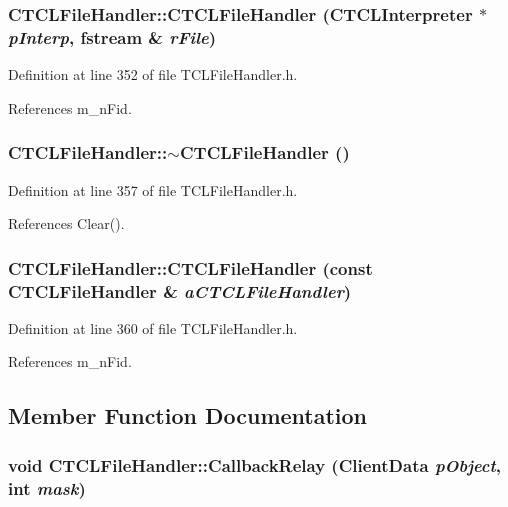 \subsubsection{\setlength{\rightskip}{0pt plus 5cm}CTCLFile\-Handler::CTCLFile\-Handler ({\bf CTCLInterpreter} $\ast$ {\em p\-Interp}, fstream \& {\em r\-File})\hspace{0.3cm}{\tt  [inline]}}\label{classCTCLFileHandler_a5}




Definition at line 352 of file TCLFile\-Handler.h.

References m\_\-n\-Fid.
\subsubsection{\setlength{\rightskip}{0pt plus 5cm}CTCLFile\-Handler::$\sim$CTCLFile\-Handler ()\hspace{0.3cm}{\tt  [inline]}}\label{classCTCLFileHandler_a6}




Definition at line 357 of file TCLFile\-Handler.h.

References Clear().
\subsubsection{\setlength{\rightskip}{0pt plus 5cm}CTCLFile\-Handler::CTCLFile\-Handler (const CTCLFile\-Handler \& {\em a\-CTCLFile\-Handler})\hspace{0.3cm}{\tt  [inline]}}\label{classCTCLFileHandler_a7}




Definition at line 360 of file TCLFile\-Handler.h.

References m\_\-n\-Fid.

\subsection{Member Function Documentation}
\subsubsection{\setlength{\rightskip}{0pt plus 5cm}void CTCLFile\-Handler::Callback\-Relay (Client\-Data {\em p\-Object}, int {\em mask})\hspace{0.3cm}{\tt  [static]}}\label{classCTCLFileHandler_d0}




